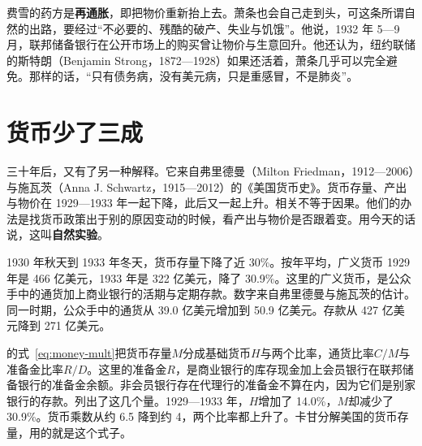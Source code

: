 费雪的药方是\textbf{再通胀}，即把物价重新抬上去。萧条也会自己走到头，可这条所谓自然的出路，要经过“不必要的、残酷的破产、失业与饥饿”\cite{fisher1933}。他说，1932 年 5—9 月，联邦储备银行在公开市场上的购买曾让物价与生意回升\cite{fisher1933}。他还认为，纽约联储的斯特朗（Benjamin Strong，1872—1928）如果还活着，萧条几乎可以完全避免。那样的话，“只有债务病，没有美元病，只是重感冒，不是肺炎”\cite{fisher1933}。

\section{货币少了三成}\label{sec:depressionus-money}

三十年后，又有了另一种解释。它来自弗里德曼（Milton Friedman，1912—2006）与施瓦茨（Anna J. Schwartz，1915—2012）的《美国货币史》\cite{bnf28,bernanke2002}。货币存量、产出与物价在 1929—1933 年一起下降，此后又一起上升\cite{bernanke2002}。相关不等于因果。他们的办法是找货币政策出于别的原因变动的时候，看产出与物价是否跟着变。用今天的话说，这叫\textbf{自然实验}\cite{bernanke2002}。

1930 年秋天到 1933 年冬天，货币存量下降了近 30\%\cite{frhgd}。按年平均，广义货币 1929 年是 466 亿美元，1933 年是 322 亿美元，降了 30.9\%\cite{census1975x}。这里的广义货币，是公众手中的通货加上商业银行的活期与定期存款。数字来自弗里德曼与施瓦茨的估计\cite{census1975x}。同一时期，公众手中的通货从 39.0 亿美元增加到 50.9 亿美元。存款从 427 亿美元降到 271 亿美元\cite{census1975x}。

的式~\eqref{eq:money-mult}把货币存量$M$分成基础货币$H$与两个比率，通货比率$C/M$与准备金比率$R/D$。这里的准备金$R$，是商业银行的库存现金加上会员银行在联邦储备银行的准备金余额。非会员银行存在代理行的准备金不算在内，因为它们是别家银行的存款\cite{census1975x,frb1937a}。列出了这几个量。1929—1933 年，$H$增加了 14.0\%，$M$却减少了 30.9\%。货币乘数从约 6.5 降到约 4，两个比率都上升了。卡甘分解美国的货币存量，用的就是这个式子\cite{cagan1965}。

